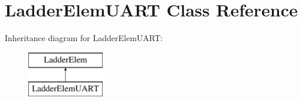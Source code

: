 \hypertarget{class_ladder_elem_u_a_r_t}{\section{Ladder\-Elem\-U\-A\-R\-T Class Reference}
\label{class_ladder_elem_u_a_r_t}
}
Inheritance diagram for Ladder\-Elem\-U\-A\-R\-T\-:\begin{figure}[H]
\begin{center}
\leavevmode
\includegraphics[height=2.000000cm]{class_ladder_elem_u_a_r_t}
\end{center}
\end{figure}
